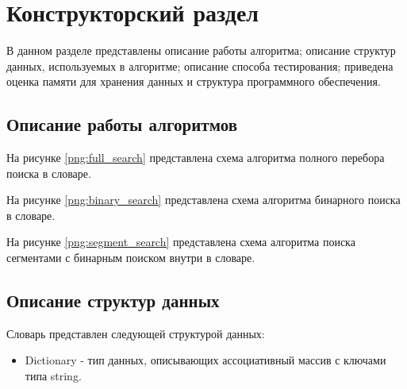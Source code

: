 \chapter{Конструкторский раздел}

В данном разделе представлены описание работы алгоритма; описание структур данных, используемых в алгоритме; описание способа тестирования; приведена оценка памяти для хранения данных и структура программного обеспечения.

\section{Описание работы алгоритмов}
На рисунке \ref{png:full_search} представлена схема алгоритма полного перебора поиска в словаре.
\begin{figure}[H]
\end{figure}

На рисунке \ref{png:binary_search} представлена схема алгоритма бинарного поиска в словаре.
\begin{figure}[H]
\end{figure}

\newpage
На рисунке \ref{png:segment_search} представлена схема алгоритма поиска сегментами с бинарным поиском внутри в словаре.
\begin{figure}[H]
\end{figure}

\section{Описание структур данных}
Словарь представлен следующей структурой данных:
\begin{itemize}
	\item Dictionary - тип данных, описывающих ассоциативный массив с ключами типа string.
\end{itemize}

